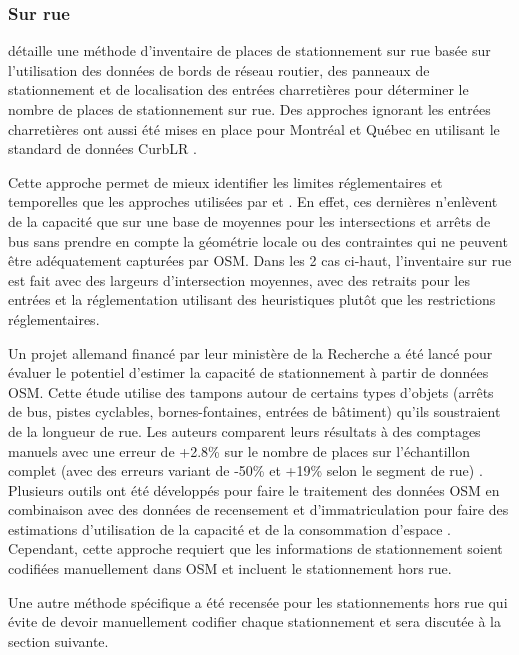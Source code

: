         \subsubsection{Sur rue}
            \textcite{bourdeau_methodologie_2014} détaille une méthode d'inventaire de places de stationnement sur rue basée sur l'utilisation des données de bords de réseau routier, des panneaux de stationnement et de localisation des entrées charretières pour déterminer le nombre de places de stationnement sur rue. Des approches ignorant les entrées charretières ont aussi été mises en place pour Montréal et Québec \parencite{fabrique_des_mobilites_curblr_2022} en utilisant le standard de données CurbLR \parencite{eros_curblr_2025}. \par
            Cette approche permet de mieux identifier les limites réglementaires et temporelles que les approches utilisées par \textcite{chester_inventorying_2022} et \textcite{scharnhorst_quantified_2018}. En effet, ces dernières n'enlèvent de la capacité que sur une base de moyennes pour les intersections et arrêts de bus sans prendre en compte la géométrie locale ou des contraintes qui ne peuvent être adéquatement capturées par \ac{OSM}. Dans les 2 cas ci-haut, l'inventaire sur rue est fait avec des largeurs d'intersection moyennes, avec des retraits pour les entrées et la réglementation utilisant des heuristiques plutôt que les restrictions réglementaires. \par
            Un projet allemand financé par leur ministère de la Recherche \parencite{open_knowledge_foundation_deutschland_parkraumdaten_2025} a été lancé pour évaluer le potentiel d'estimer la capacité de stationnement à partir de données \ac{OSM}. Cette étude utilise des tampons autour de certains types d'objets (arrêts de bus, pistes cyclables, bornes-fontaines, entrées de bâtiment) qu'ils soustraient de la longueur de rue.  Les auteurs comparent leurs résultats à des comptages manuels avec une erreur de +2.8\% sur le nombre de places sur l'échantillon complet (avec des erreurs variant de -50\% et +19\% selon le segment de rue) \parencite{seidel_methodenbericht_2021}. Plusieurs outils ont été développés pour faire le traitement des données \ac{OSM} en combinaison avec des données de recensement et d'immatriculation pour faire des estimations d'utilisation de la capacité et de la consommation d'espace \parencite{seidel_methodenbericht_2021,seidel_parking_2021,jordans_osmberlinparkraumosm-_2025}. Cependant, cette approche requiert que les informations de stationnement soient codifiées manuellement dans \ac{OSM} et incluent le stationnement hors rue.\par
            Une autre méthode spécifique a été recensée pour les stationnements hors rue qui évite de devoir manuellement codifier chaque stationnement et sera discutée à la section suivante.
